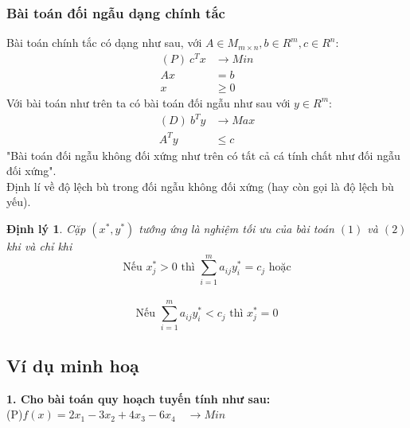 \documentclass{article}
\newtheorem{dl}{Định lý}
\begin{document}
        \subsubsection{Bài toán đối ngẫu dạng chính tắc}
            Bài toán chính tắc có dạng như sau, với $A \in M_{m \times n},b \in R^m, c \in R^n$:
                \begin{equation}
                    \begin{split}
                        (P) \: c^Tx &\rightarrow Min \\
                        Ax&=b \\
                        x &\geq 0
                    \end{split}
                \end{equation}
            Với bài toán như trên ta có bài toán đối ngẫu như sau với $y \in R^m$:
                \begin{equation}
                    \begin{split}
                        (D) \: b^Ty &\rightarrow Max \\
                        A^Ty &\leq c
                    \end{split}
                \end{equation}
            "Bài toán đối ngẫu không đối xứng như trên có tất cả cá tính chất như đối ngẫu đối xứng". \\
            Định lí về độ lệch bù trong đối ngẫu không đối xứng (hay còn gọi là độ lệch bù yếu).
            \begin{dl}
                Cặp $(x^*,y^*)$ tướng ứng là nghiệm tối ưu của bài toán $(1)$ và $(2)$ khi và chỉ khi
                $$\text{Nếu } x_j^* > 0 \text{ thì } \sum_{i=1}^ma_{ij}y_i^*=c_j \text{ hoặc}$$ \\
                $$\text{Nếu } \sum_{i=1}^ma_{ij}y_i^* < c_j \text{ thì } x_j^*=0$$
            \end{dl}
    \subsection{Ví dụ minh hoạ}
    \textbf{1. Cho bài toán quy hoạch tuyến tính như sau:}\\

    \big(P\big)\quad $f(x)=2x_1-3x_2+4x_3-6x_4\quad \longrightarrow Min$\\
    
\end{document}
